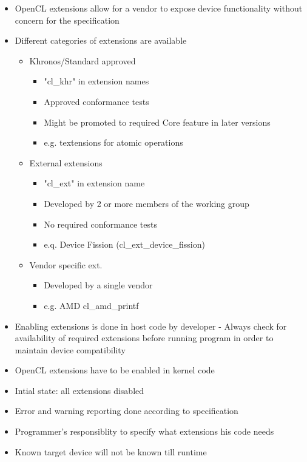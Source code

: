 \documentclass[paper=a4, fontsize=11pt]{scrartcl} %
\numberwithin{equation}{section} %
\numberwithin{figure}{section} %
\numberwithin{table}{section} %
\begin{document}
\begin{itemize}
  \begin{itemize}
    \item OpenCL extensions allow for a vendor to expose device functionality without concern for the specification
    \item Different categories of extensions are available
    \begin{itemize}
      \item Khronos/Standard approved
      \begin{itemize}
        \item "cl_khr" in extension names
        \item Approved conformance tests
        \item Might be promoted to required Core feature in later versions
        \item e.g. textensions for atomic operations
      \end{itemize}
      \item External extensions
      \begin{itemize}
        \item "cl_ext" in extension name
        \item Developed by 2 or more members of the working group
        \item No required conformance tests
        \item e.q. Device Fission (cl_ext_device_fission)
      \end{itemize}
      \item Vendor specific ext.
      \begin{itemize}
        \item Developed by a single vendor
        \item e.g. AMD cl_amd_printf
      \end{itemize}
    \end{itemize}
    \item Enabling extensions is done in host code by developer - Always check for availability of required extensions before running program in order to maintain device compatibility
    \item OpenCL extensions have to be enabled in kernel code
    \item Intial state: all extensions disabled
    \item Error and warning reporting done according to specification
    \item Programmer's responsiblity to specify what extensions his code needs
    \item Known target device will not be known till runtime

\end{itemize}
\end{itemize}
\end{document}
